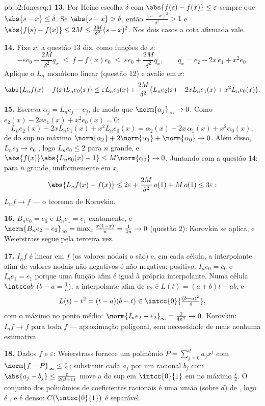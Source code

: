 \begin{solution}{pb:b2:funcseq:1}
\textbf{13.} Por Heine escolha $\delta$ com $\abs{f(s)-f(x)}
\leq \varepsilon$ sempre que $\abs{s-x} \leq \delta$. Se
$\abs{s - x} > \delta$, então $\frac{(s-x)^2}{\delta^2} > 1$ e
$\abs{f(s)-f(x)} \leq 2M \leq \frac{2M}{\delta^2}(s-x)^2$. Nos
dois casos a cota afirmada vale.

\textbf{14.} Fixe $x$; a questão 13 diz, como funções de $s$:
\[
-\varepsilon e_0 - \frac{2M}{\delta^2}q_x
\;\leq\; f - f(x)e_0
\;\leq\; \varepsilon e_0 + \frac{2M}{\delta^2}q_x,
\qquad q_x = e_2 - 2x\,e_1 + x^2e_0 .
\]
Aplique o $L_n$ monótono linear (questão 12) e avalie em
$x$:
\[
\abs{L_nf(x) - f(x)L_ne_0(x)}
\leq \varepsilon L_ne_0(x)
+ \frac{2M}{\delta^2}\bigl(L_ne_2(x) - 2xL_ne_1(x)
+ x^2L_ne_0(x)\bigr) .
\]

\textbf{15.} Escreva $\alpha_j = L_ne_j - e_j$, de modo que
$\norm{\alpha_j}_\infty \to 0$. Como $e_2(x) - 2xe_1(x) +
x^2e_0(x) = 0$:
\[
L_ne_2(x) - 2xL_ne_1(x) + x^2L_ne_0(x)
= \alpha_2(x) - 2x\,\alpha_1(x) + x^2\alpha_0(x),
\]
de  do sup no máximo $\norm{\alpha_2} + 2\norm{\alpha_1} +
\norm{\alpha_0} \to 0$. Além disso, $L_ne_0 \to e_0$ , logo
$L_ne_0 \leq 2$ para $n$ grande, e $\abs{f(x)}\abs{L_ne_0(x) -
1} \leq M\norm{\alpha_0} \to 0$. Juntando com a questão 14:
para $n$ grande, uniformemente em $x$,
\[
\abs{L_nf(x) - f(x)} \leq 2\varepsilon +
\frac{2M}{\delta^2}\,o(1) + M\,o(1) \leq 3\varepsilon :
\]
$L_nf \to f$  --- o teorema de Korovkin.

\textbf{16.} $B_ne_0 = e_0$ e $B_ne_1 = e_1$ exatamente, e
$\norm{B_ne_2 - e_2}_\infty = \max_x\frac{x(1-x)}{n} =
\frac{1}{4n} \to 0$ (questão 2): Korovkin se aplica, e
Weierstrass segue pela terceira vez.

\textbf{17.} $I_nf$ é linear em $f$ (os valores nodais o são) e, em
cada célula, a interpolante afim de valores nodais não negativos é
não negativa: positivo. $I_ne_0 = e_0$ e $I_ne_1 = e_1$
porque uma função afim é igual à própria interpolante. Numa
célula $\intcc ab$ ($b - a = \frac1n$), a interpolante afim de
$e_2$ é $L(t) = (a+b)t - ab$, e
\[
L(t) - t^2 = (t-a)(b-t) \in
\intcc{0}{\tfrac{(b-a)^2}{4}} ,
\]
com o máximo no ponto médio: $\norm{I_ne_2 - e_2}_\infty =
\frac{1}{4n^2} \to 0$. Korovkin: $I_nf \to f$  para
toda $f$  --- aproximação poligonal, sem
necessidade de mais nenhuma estimativa.

\textbf{18.} Dados $f$ e $\varepsilon$: Weierstrass fornece
um polinômio $P = \sum_{j=0}^d a_jx^j$ com $\norm{f -
P}_\infty \leq \frac\varepsilon2$; substituir cada $a_j$ por um
racional $b_j$ com $\abs{a_j - b_j} \leq
\frac{\varepsilon}{2(d+1)}$ move a  do sup em
$\intcc{0}{1}$ em no máximo $\frac\varepsilon2$. O conjunto dos
polinômios de coeficientes racionais é uma união  (sobre
$d$) de , logo é , e é denso:
$C(\intcc{0}{1})$ é separável.


\end{solution}
